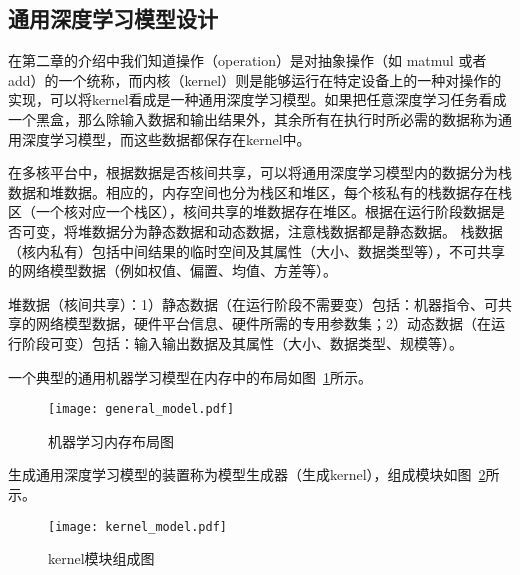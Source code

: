 \subsection {通用深度学习模型设计}
在第二章的介绍中我们知道操作（operation）是对抽象操作（如 matmul 或者 add）的一个统称，而内核（kernel）则是能够运行在特定设备上的一种对操作的实现，可以将kernel看成是一种通用深度学习模型。如果把任意深度学习任务看成一个黑盒，那么除输入数据和输出结果外，其余所有在执行时所必需的数据称为通用深度学习模型，而这些数据都保存在kernel中。

在多核平台中，根据数据是否核间共享，可以将通用深度学习模型内的数据分为栈数据和堆数据。相应的，内存空间也分为栈区和堆区，每个核私有的栈数据存在栈区（一个核对应一个栈区），核间共享的堆数据存在堆区。根据在运行阶段数据是否可变，将堆数据分为静态数据和动态数据，注意栈数据都是静态数据。
栈数据（核内私有）包括中间结果的临时空间及其属性（大小、数据类型等），不可共享的网络模型数据（例如权值、偏置、均值、方差等）。

堆数据（核间共享）：1）静态数据（在运行阶段不需要变）包括：机器指令、可共享的网络模型数据，硬件平台信息、硬件所需的专用参数集；2）动态数据（在运行阶段可变）包括：输入输出数据及其属性（大小、数据类型、规模等）。

一个典型的通用机器学习模型在内存中的布局如图~\ref{fig:general-model}所示。

\begin{figure}[htb]
  \centering
  \texttt{[image: general\_model.pdf]}
  \caption{机器学习内存布局图}
  \label{fig:general-model}
\end{figure}

生成通用深度学习模型的装置称为模型生成器（生成kernel），组成模块如图~\ref{fig:kernel-model}所示。
\begin{figure}[htb]
  \centering
  \texttt{[image: kernel\_model.pdf]}
  \caption{kernel模块组成图}
  \label{fig:kernel-model}
\end{figure}

